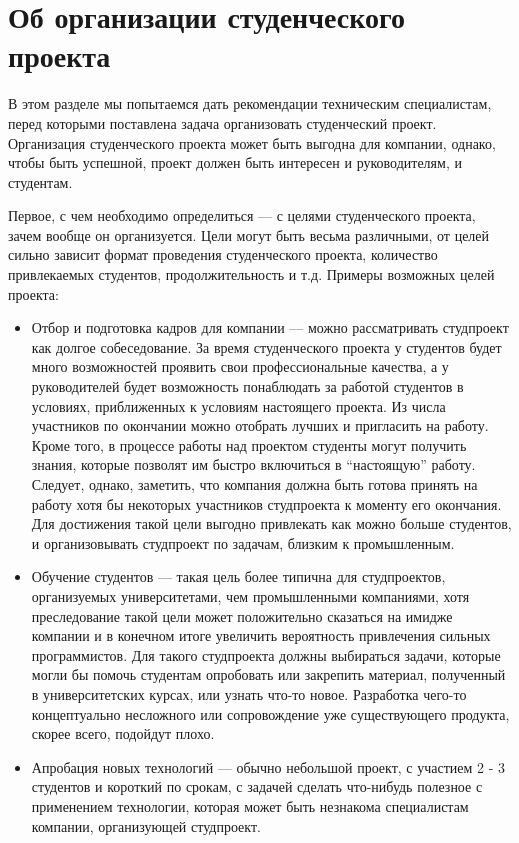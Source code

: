 \documentclass[a5paper]{article}
\begin{document}
\section{Об организации студенческого проекта}
В этом разделе мы попытаемся дать рекомендации техническим специалистам, перед которыми поставлена задача организовать студенческий проект. Организация студенческого проекта может быть выгодна для компании, однако, чтобы быть успешной, проект должен быть интересен и руководителям, и студентам. 

Первое, с чем необходимо определиться --- с целями студенческого проекта, зачем вообще он организуется. Цели могут быть весьма различными, от целей сильно зависит формат проведения студенческого проекта, количество привлекаемых студентов, продолжительность и т.д. Примеры возможных целей проекта:
\begin{itemize}
  \item Отбор и подготовка кадров для компании --- можно рассматривать студпроект как долгое собеседование. За время студенческого проекта у студентов будет много возможностей проявить свои профессиональные качества, а у руководителей будет возможность понаблюдать за работой студентов в условиях, приближенных к условиям настоящего проекта. Из числа участников по окончании можно отобрать лучших и пригласить на работу. Кроме того, в процессе работы над проектом студенты могут получить знания, которые позволят им быстро включиться в ``настоящую'' работу. Следует, однако, заметить, что компания должна быть готова принять на работу хотя бы некоторых участников студпроекта к моменту его окончания. Для достижения такой цели выгодно привлекать как можно больше студентов, и организовывать студпроект по задачам, близким к промышленным.
	\item Обучение студентов --- такая цель более типична для студпроектов, организуемых университетами, чем промышленными компаниями, хотя преследование такой цели может положительно сказаться на имидже компании и в конечном итоге увеличить вероятность привлечения сильных программистов. Для такого студпроекта должны выбираться задачи, которые могли бы помочь студентам опробовать или закрепить материал, полученный в университетских курсах, или узнать что-то новое. Разработка чего-то концептуально несложного или сопровождение уже существующего продукта, скорее всего, подойдут плохо.
	\item Апробация новых технологий --- обычно небольшой проект, с участием 2 - 3 студентов и короткий по срокам, с задачей сделать что-нибудь полезное с применением технологии, которая может быть незнакома специалистам компании, организующей студпроект.

\end{itemize}
\end{document}
